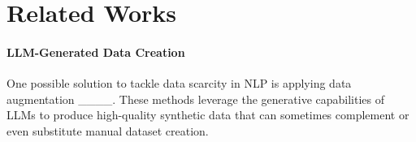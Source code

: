\section{Related Works}
\paragraph{LLM-Generated Data Creation} One possible solution to tackle data scarcity in NLP is applying data augmentation ____. These methods leverage the generative capabilities of LLMs to produce high-quality synthetic data that can sometimes complement or even substitute manual dataset creation.




